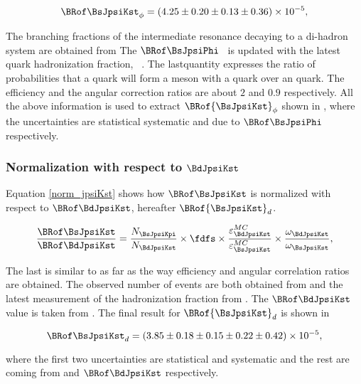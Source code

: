 \begin{equation}
\BRof\BsJpsiKst_{\phi} = (4.25 \pm 0.20 \pm 0.13 \pm 0.36) \times 10^{-5},
\label{Br_JpsiPhi}
\end{equation}

\noindent The branching fractions of the intermediate resonance decaying to a di-hadron system are obtained from \cite{PDG}
The $\BRof\BsJpsiPhi$~\cite{SheldonKK} is updated with the latest \bquark quark hadronization
fraction, \fdfs~\cite{LHCb-CONF-2013-011}. The lastquantity expresses the ratio of probabilities that a \bquark quark will form a meson with a
\dquark quark over an \squark quark. The efficiency and the angular correction ratios are about $2$ and $0.9$ respectively.
All the above information is used to extract $\BRof{\BsJpsiKst}_\phi$ shown in , where the uncertainties
are statistical systematic and due to  $\BRof\BsJpsiPhi$ respectively.

\subsubsection{Normalization with respect to $\BdJpsiKst$}
Equation \ref{norm_jpsiKst} shows how $\BRof\BsJpsiKst$ is normalized with respect to $\BRof\BdJpsiKst$, hereafter $\BRof{\BsJpsiKst}_d$.

\begin{equation}
\frac{\BRof\BsJpsiKst}{\BRof\BdJpsiKst} = \frac{N_{\BsJpsiKpi}}{N_{\BdJpsiKst}} \times \fdfs \times \frac{\varepsilon_{\BdJpsiKst}^{MC}}{\varepsilon_{\BsJpsiKst}^{MC}}
                                                                          \times \frac{\omega_{\BdJpsiKst}}{\omega_{\BsJpsiKst}},
\label{norm_jpsiKst}
\end{equation}

\noindent The last is similar to  as far as the way efficiency and angular correlation ratios are obtained.
The observed number of events are both obtained from  and the latest measurement of the hadronization
fraction from \cite{LHCb-CONF-2013-011}. The $\BRof\BdJpsiKst$ value is taken from \cite{Abe:2002haa}. The final result for $\BRof{\BsJpsiKst}_d$
is shown in 

\begin{equation}
\BRof\BsJpsiKst_{d} = (3.85 \pm 0.18 \pm 0.15 \pm 0.22 \pm 0.42 )\times 10^{-5},
\label{Br_JpsiKst}
\end{equation}

 \noindent where the first two uncertainties are statistical and systematic and the rest are coming from \fdfs and $\BRof\BdJpsiKst$ respectively.

